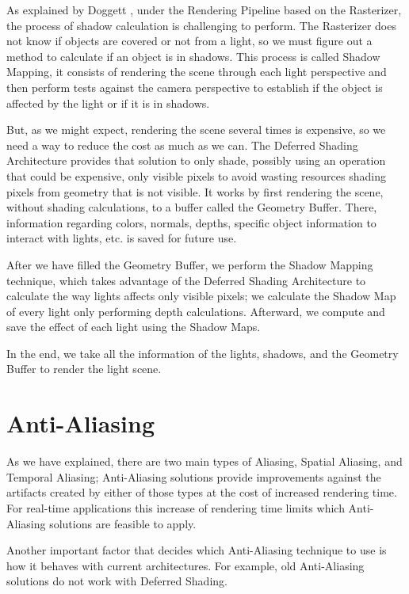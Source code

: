 \documentclass{cslthse-msc}
\begin{document}
As explained by Doggett \cite{Doggett2017EDAN35}, under the Rendering Pipeline based on the Rasterizer, the process of shadow calculation is challenging to perform. The Rasterizer does not know if objects are covered or not from a light, so we must figure out a method to calculate if an object is in shadows. This process is called Shadow Mapping, it consists of rendering the scene through each light perspective and then perform tests against the camera perspective to establish if the object is affected by the light or if it is in shadows.

But, as we might expect, rendering the scene several times is expensive, so we need a way to reduce the cost as much as we can. The Deferred Shading Architecture provides that solution to only shade, possibly using an operation that could be expensive, only visible pixels to avoid wasting resources shading pixels from geometry that is not visible. It works by first rendering the scene, without shading calculations, to a buffer called the Geometry Buffer. There, information regarding colors, normals, depths, specific object information to interact with lights, etc. is saved for future use. 

After we have filled the Geometry Buffer, we perform the Shadow Mapping technique, which takes advantage of the Deferred Shading Architecture to calculate the way lights affects only visible pixels; we calculate the Shadow Map of every light only performing depth calculations. Afterward, we compute and save the effect of each light using the Shadow Maps. 

In the end, we take all the information of the lights, shadows, and the Geometry Buffer to render the light scene.




\section{Anti-Aliasing}
As we have explained, there are two main types of Aliasing, Spatial Aliasing, and Temporal Aliasing; Anti-Aliasing solutions provide improvements against the artifacts created by either of those types at the cost of increased rendering time. For real-time applications this increase of rendering time limits which Anti-Aliasing solutions are feasible to apply.

Another important factor that decides which Anti-Aliasing technique to use is how it behaves with current architectures. For example, old Anti-Aliasing solutions do not work with Deferred Shading.
\end{document}
